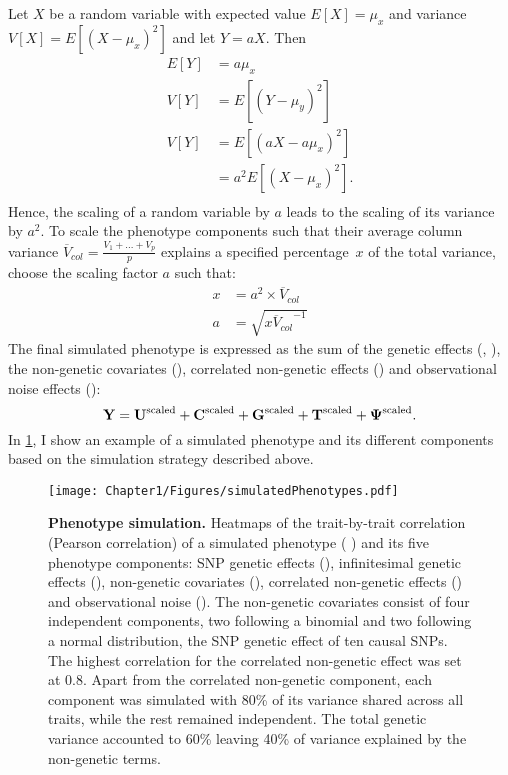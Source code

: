 Let \(X\) be a random variable with expected value \(E[X] = \mu_{x}\) and variance \(V[X] = E[(X - \mu_{x})^2]\) and let  \(Y = aX\). Then
\begin{equation}
\begin{aligned}
E[Y] &= a\mu_{x} \\
V[Y] &= E[(Y - \mu_{y})^2] \\
V[Y] &= E[(aX - a\mu_{x})^2] \\
		&= a^2 E[(X - \mu_{x})^2]. \\
\end{aligned}
\end{equation}
%
Hence, the scaling of a random variable by \(a\) leads to the scaling of its variance by \(a^2\). To scale the phenotype components such that their average column variance \(\overline{V}_{col} = \frac{V_1 + ... + V_p}{p} \) explains a specified percentage~\(x\) of the total variance, choose the scaling factor \(a\) such that: 
\begin{equation}
\begin{aligned}
x  &= a^2 \times \overline{V}_{col} \\
a  &= \sqrt{x{\overline{V}_{col}}^{-1}}
\end{aligned}
\end{equation}
%
The final simulated phenotype   is expressed as the sum of the genetic effects (, ), the non-genetic covariates (), correlated non-genetic effects () and observational noise effects ():
\begin{equation}
\boldsymbol{\mathbf{Y}} = \boldsymbol{\mathbf{U}}^\text{scaled}   + \boldsymbol{\mathbf{C}}^\text{scaled} +  \boldsymbol{\mathbf{G}}^\text{scaled} + \boldsymbol{\mathbf{T}}^\text{scaled} + \boldsymbol{\mathbf{\Psi}}^\text{scaled} .
\end{equation}
%
In \cref{fig:simulation}, I show an example of a simulated phenotype and its different components based on the simulation strategy described above. 
\begin{figure}[h]
	\centering
	\texttt{[image: Chapter1/Figures/simulatedPhenotypes.pdf]}
	\caption[\textbf{Phenotype simulation.}]{\textbf{Phenotype simulation.} Heatmaps of the trait-by-trait correlation (Pearson correlation) of a simulated phenotype ( ) and its five phenotype components: SNP genetic effects  (), infinitesimal genetic effects (), non-genetic covariates (), correlated non-genetic effects () and observational noise (). The non-genetic covariates consist of four independent components, two following a binomial and two following a normal distribution, the SNP genetic effect of ten causal SNPs. The highest correlation for the correlated non-genetic effect was set at \num{0.8}. Apart from the correlated non-genetic component, each component was simulated with \num{80}\% of its variance shared across all traits, while the rest remained independent. The total genetic variance accounted to \num{60}\% leaving \num{40}\% of variance explained by the non-genetic terms.}
	\label{fig:simulation}
\end{figure}

